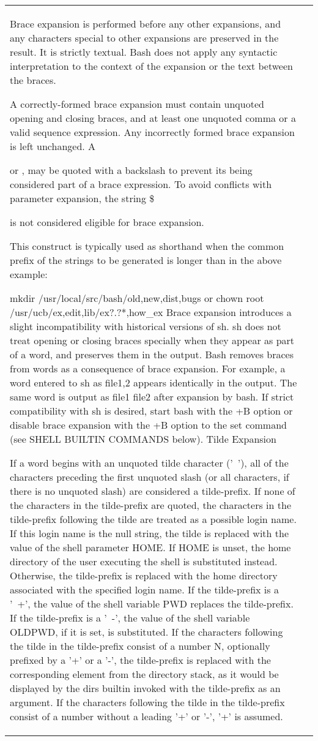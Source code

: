 \documentclass[11pt]{article}
\begin{document}
\begin{longtable}{p{}p{}}
Brace expansion is performed before any other expansions, and any characters special to other expansions are preserved in the result. It is strictly textual. Bash does not apply any syntactic interpretation to the context of the expansion or the text between the braces.

A correctly-formed brace expansion must contain unquoted opening and closing braces, and at least one unquoted comma or a valid sequence expression. Any incorrectly formed brace expansion is left unchanged. A { or , may be quoted with a backslash to prevent its being considered part of a brace expression. To avoid conflicts with parameter expansion, the string \${ is not considered eligible for brace expansion.

This construct is typically used as shorthand when the common prefix of the strings to be generated is longer than in the above example:

mkdir /usr/local/src/bash/{old,new,dist,bugs}
or
chown root /usr/{ucb/{ex,edit},lib/{ex?.?*,how_ex}}
Brace expansion introduces a slight incompatibility with historical versions of sh. sh does not treat opening or closing braces specially when they appear as part of a word, and preserves them in the output. Bash removes braces from words as a consequence of brace expansion. For example, a word entered to sh as file{1,2} appears identically in the output. The same word is output as file1 file2 after expansion by bash. If strict compatibility with sh is desired, start bash with the +B option or disable brace expansion with the +B option to the set command (see SHELL BUILTIN COMMANDS below).
Tilde Expansion

If a word begins with an unquoted tilde character ('~'), all of the characters preceding the first unquoted slash (or all characters, if there is no unquoted slash) are considered a tilde-prefix. If none of the characters in the tilde-prefix are quoted, the characters in the tilde-prefix following the tilde are treated as a possible login name. If this login name is the null string, the tilde is replaced with the value of the shell parameter HOME. If HOME is unset, the home directory of the user executing the shell is substituted instead. Otherwise, the tilde-prefix is replaced with the home directory associated with the specified login name.
If the tilde-prefix is a '~+', the value of the shell variable PWD replaces the tilde-prefix. If the tilde-prefix is a '~-', the value of the shell variable OLDPWD, if it is set, is substituted. If the characters following the tilde in the tilde-prefix consist of a number N, optionally prefixed by a '+' or a '-', the tilde-prefix is replaced with the corresponding element from the directory stack, as it would be displayed by the dirs builtin invoked with the tilde-prefix as an argument. If the characters following the tilde in the tilde-prefix consist of a number without a leading '+' or '-', '+' is assumed.

}}
\end{longtable}
\end{document}

